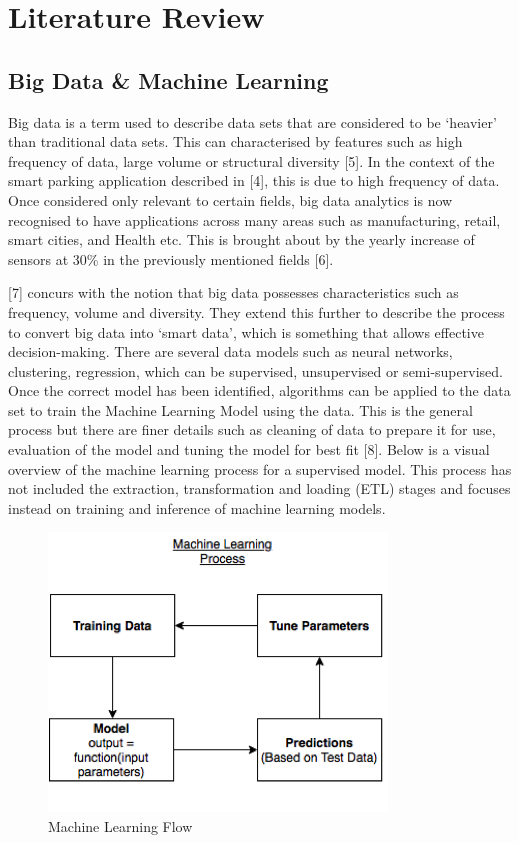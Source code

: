 
\section{Literature Review}

\subsection{Big Data \& Machine Learning}
Big data is a term used to describe data sets that are considered to be ‘heavier’ than traditional data sets. This can characterised by features such as high frequency of data, large volume or structural diversity [5]. In the context of the smart parking application described in [4], this is due to high frequency of data. Once considered only relevant to certain fields, big data analytics is now recognised to have applications across many areas such as manufacturing, retail, smart cities, and Health etc. This is brought about by the yearly increase of sensors at 30\% in the previously mentioned fields [6].  

 

[7] concurs with the notion that big data possesses characteristics such as frequency, volume and diversity.  They extend this further to describe the process to convert big data into ‘smart data’, which is something that allows effective decision-making. There are several data models such as neural networks, clustering, regression, which can be supervised, unsupervised or semi-supervised. Once the correct model has been identified, algorithms can be applied to the data set to train the Machine Learning Model using the data. This is the general process but there are finer details such as cleaning of data to prepare it for use, evaluation of the model and tuning the model for best fit [8].  Below is a visual overview of the machine learning process for a supervised model. This process has not included the extraction, transformation and loading (ETL) stages and focuses instead on training and inference of machine learning models. 

%
%
    \begin{figure}[H]
      
      \includegraphics[scale=1.5]{images/MLDiagram.png}
      \caption{Machine Learning Flow}
      \label{fig:Spark}
          
    \end{figure}

